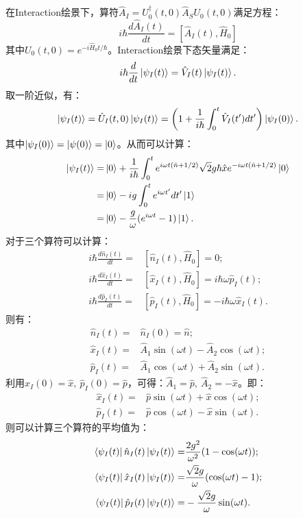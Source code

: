 \documentclass[reqno,a4paper,12pt]{amsart}
\begin{document}
\begin{tcolorbox}[breakable, colback = black!5!white, colframe = black]
在Interaction绘景下，算符$\hat{A}_I = U_0^\dagger(t,0) \hat{A}_S U_0(t,0)$满足方程：
\[
	i\hbar\frac{d\hat{A}_I(t)}{dt} = [\hat{A}_I(t), \hat{H}_0]
\]
其中$U_0(t,0) = e^{-i\hat{H}_0t/\hbar}$。Interaction绘景下态矢量满足：
\[
	i\hbar\frac{d}{dt}\ket{\psi_I(t)} = \hat{V}_I(t) \ket{\psi_I(t)}.
\]
取一阶近似，有：
\[
	\ket{\psi_I(t)} = \hat{U}_I(t,0) \ket{\psi_I(t)} = \left( 1 + \frac{1}{i\hbar} \int_0^t \hat{V}_I(t')dt' \right) \ket{\psi_I(0)}.
\]
其中$\ket{\psi_I(0)} = \ket{\psi(0)} = \ket{0}$。从而可以计算：
\begin{align*}
	\ket{\psi_I(t)} =& \ket{0} + \frac{1}{i\hbar} \int_0^t e^{i\omega t(\hat{n}+1/2)} \sqrt{2}g\hbar\hat{x} e^{-i\omega t(\hat{n}+1/2)} \ket{0} \\
	=& \ket{0} - ig\int_0^t e^{i\omega t'}dt' \ket{1} \\
	=& \ket{0} - \frac{g}{\omega}(e^{i\omega t} - 1) \ket{1}.
\end{align*}
对于三个算符可以计算：
\begin{align*}
	i\hbar\frac{d\hat{n}_I(t)}{dt} =& [\hat{n}_I(t), \hat{H}_0] = 0; \\
	i\hbar\frac{d\hat{x}_I(t)}{dt} =& [\hat{x}_I(t), \hat{H}_0] = i\hbar\omega \hat{p}_I(t); \\
	i\hbar\frac{d\hat{p}_I(t)}{dt} =& [\hat{p}_I(t), \hat{H}_0] = -i\hbar\omega \hat{x}_I(t).
\end{align*}
则有：
\begin{align*}
	\hat{n}_I(t) =& \hat{n}_I(0) = \hat{n}; \\
	\hat{x}_I(t) =& \hat{A}_1 \sin(\omega t) - \hat{A}_2 \cos(\omega t); \\
	\hat{p}_I(t) =& \hat{A}_1 \cos(\omega t) + \hat{A}_2 \sin(\omega t).
\end{align*}
利用$\hat{x}_I(0) = \hat{x}, \ \hat{p}_I(0) = \hat{p}$，可得：$\hat{A}_1 = \hat{p}, \ \hat{A}_2 = -\hat{x}$。即：
\begin{align*}
	\hat{x}_I(t) =& \hat{p}\sin(\omega t) + \hat{x}\cos(\omega t); \\
	\hat{p}_I(t) =& \hat{p}\cos(\omega t) - \hat{x}\sin(\omega t).
\end{align*}
则可以计算三个算符的平均值为：
\begin{align*}
	\bra{\psi_I(t)} \hat{n}_I(t) \ket{\psi_I(t)} =& \frac{2g^2}{\omega^2}(1-\cos(\omega t)); \\
	\bra{\psi_I(t)} \hat{x}_I(t) \ket{\psi_I(t)} =& \frac{\sqrt{2}g}{\omega}(\cos(\omega t)-1); \\
	\bra{\psi_I(t)} \hat{p}_I(t) \ket{\psi_I(t)} =& -\frac{\sqrt{2}g}{\omega}\sin(\omega t).
\end{align*}

\end{tcolorbox}
\end{document}
